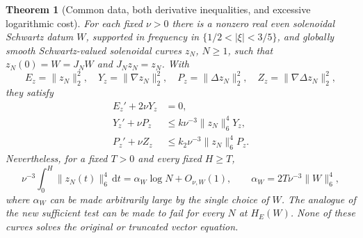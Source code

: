 \documentclass[11pt,a4paper]{article}
\newtheorem{theorem}{Theorem}[section]
\theoremstyle{definition}\newtheorem{definition}[theorem]{Definition}
\theoremstyle{remark}\newtheorem{remark}[theorem]{Remark}
\newcommand{\dd}{\,\mathrm d}
\newcommand{\norm}[1]{\lVert #1\rVert}
\numberwithin{equation}{section}
\begin{document}
\begin{theorem}[Common data, both derivative inequalities, and excessive logarithmic cost]\label{thm:cap}
For each fixed $\nu>0$ there is a nonzero real even solenoidal Schwartz datum $W$, supported in frequency in $\{1/2<|\xi|<3/5\}$, and globally smooth Schwartz-valued solenoidal curves $z_N$, $N\ge1$, such that $z_N(0)=W=J_NW$ and $J_Nz_N=z_N$. With
\[
 E_z=\norm{z_N}_2^2,\quad Y_z=\norm{\nabla z_N}_2^2,
 \quad P_z=\norm{\Delta z_N}_2^2,\quad Z_z=\norm{\nabla\Delta z_N}_2^2,
\]
they satisfy
\begin{align}
 E_z'+2\nu Y_z&=0,\label{eq:capE}\\
 Y_z'+\nu P_z&\le k\nu^{-3}\norm{z_N}_6^4Y_z,\label{eq:capY}\\
 P_z'+\nu Z_z&\le k_2\nu^{-3}\norm{z_N}_6^4P_z.\label{eq:capP}
\end{align}
Nevertheless, for a fixed $T>0$ and every fixed $H\ge T$,
\begin{equation}\label{eq:caplog}
 \nu^{-3}\int_0^H\norm{z_N(t)}_6^4\dd t
 =\alpha_W\log N+O_{\nu,W}(1),\qquad
 \alpha_W=2T\nu^{-3}\norm W_6^4,
\end{equation}
where $\alpha_W$ can be made arbitrarily large by the single choice of $W$. The analogue of the new sufficient test can be made to fail for every $N$ at $H_E(W)$. None of these curves solves the original or truncated vector equation.
\end{theorem}
\end{document}
